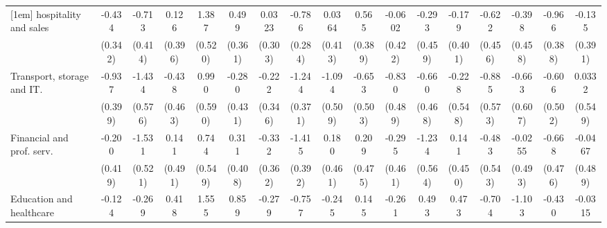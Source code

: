 {\begin{tabular}{l*{16}{c}}
[1em]
hospitality and sales&      -0.434         &      -0.713         &       0.126         &       1.387\sym{**} &       0.499         &      0.0323         &      -0.786\sym{**} &      0.0364         &       0.565         &     -0.0602         &      -0.293         &      -0.179         &      -0.622         &      -0.398         &      -0.966\sym{*}  &      -0.135         \\
                    &     (0.342)         &     (0.414)         &     (0.396)         &     (0.520)         &     (0.361)         &     (0.303)         &     (0.284)         &     (0.413)         &     (0.389)         &     (0.422)         &     (0.459)         &     (0.401)         &     (0.456)         &     (0.458)         &     (0.388)         &     (0.391)         \\
[1em]
Transport, storage and IT.&      -0.937\sym{*}  &      -1.434\sym{*}  &      -0.438         &       0.990         &      -0.280         &      -0.222         &      -1.244\sym{***}&      -1.094\sym{*}  &      -0.653         &      -0.830         &      -0.660         &      -0.228         &      -0.885         &      -0.663         &      -0.606         &      0.0332         \\
                    &     (0.399)         &     (0.576)         &     (0.463)         &     (0.590)         &     (0.431)         &     (0.346)         &     (0.371)         &     (0.509)         &     (0.503)         &     (0.489)         &     (0.468)         &     (0.548)         &     (0.573)         &     (0.607)         &     (0.502)         &     (0.549)         \\
[1em]
Financial and prof. serv.&      -0.200         &      -1.531\sym{**} &       0.141         &       0.744         &       0.311         &      -0.332         &      -1.415\sym{***}&       0.180         &       0.209         &      -0.295         &      -1.234\sym{*}  &       0.141         &      -0.483         &     -0.0255         &      -0.668         &     -0.0467         \\
                    &     (0.419)         &     (0.521)         &     (0.491)         &     (0.549)         &     (0.408)         &     (0.362)         &     (0.392)         &     (0.461)         &     (0.475)         &     (0.461)         &     (0.564)         &     (0.450)         &     (0.543)         &     (0.493)         &     (0.476)         &     (0.489)         \\
[1em]
Education and healthcare&      -0.124         &      -0.269         &       0.418         &       1.555\sym{**} &       0.859\sym{*}  &      -0.279         &      -0.757         &      -0.245         &       0.145         &      -0.261         &       0.493         &       0.473         &      -0.704         &      -1.103\sym{*}  &      -0.430         &     -0.0315         \\

\end{tabular}}
